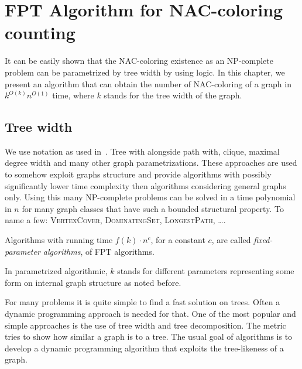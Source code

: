 \chapter{FPT Algorithm for NAC-coloring counting}

\begin{chapterabstract}

	It can be easily shown that the NAC-coloring existence as an NP-complete
	problem can be parametrized by tree width by using \MSO{} logic.
	In this chapter, we present an algorithm that can obtain
	the number of NAC-coloring of a graph in \({k}^{O(k)} n^{O(1)}\) time,
	where \(k\) stands for the tree width of the graph.

\end{chapterabstract}

\section{Tree width}

We use notation as used in~\cite{book_parametrized_algorithms}.
Tree with alongside path with, clique, maximal degree width
and many other graph parametrizations.
These approaches are used to somehow exploit graphs structure
and provide algorithms with possibly significantly lower time complexity
then algorithms considering general graphs only.
Using this many NP-complete problems can be solved in a time polynomial in \( n \)
for many graph classes that have such a bounded structural property.
To name a few: \textsc{VertexCover}, \textsc{DominatingSet}, \textsc{LongestPath}, \dots.

%
\begin{definition}
	Algorithms with running time \( f(k)\cdot n^c \), for a constant \( c \),
	are called \emph{fixed-parameter algorithms}, of FPT algorithms.
\end{definition}
%
In parametrized algorithmic, \( k \) stands for different parameters
representing some form on internal graph structure as noted before.

For many problems it is quite simple to find a fast solution on trees.
Often a dynamic programming approach is needed for that.
%
One of the most popular and simple approaches
is the use of tree width and tree decomposition.
The metric tries to show how similar a graph is to a tree.
%
The usual goal of algorithms is to develop a dynamic programming algorithm
that exploits the tree-likeness of a graph.

